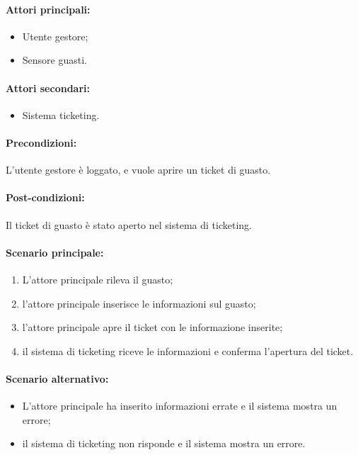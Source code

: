 \paragraph{Attori principali:}
\begin{itemize}
    \item Utente gestore;
    \item Sensore guasti.
\end{itemize}

\paragraph{Attori secondari:}
\begin{itemize}
    \item Sistema ticketing.
\end{itemize}

\paragraph{Precondizioni:}
L'utente gestore è loggato, e vuole aprire un ticket di guasto.

\paragraph{Post-condizioni:}
Il ticket di guasto è stato aperto nel sistema di ticketing.

\paragraph{Scenario principale:}
\begin{enumerate}
    \item L'attore principale rileva il guasto;
    \item l'attore principale inserisce le informazioni sul guasto;
    \item l'attore principale apre il ticket con le informazione inserite;
    \item il sistema di ticketing riceve le informazioni e conferma l'apertura del ticket.
\end{enumerate}

\paragraph{Scenario alternativo:}
\begin{itemize}
    \item L'attore principale ha inserito informazioni errate e il sistema mostra un errore;
    \item il sistema di ticketing non risponde e il sistema mostra un errore.
\end{itemize}


